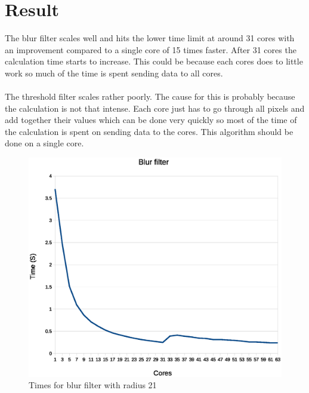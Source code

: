 \documentclass[10pt,twocolumn]{article}
\begin{document}
\section{Result}
The blur filter scales well and hits the lower time limit at around 31 cores with an improvement compared to a single core of 15 times faster. After 31 cores the calculation time starts to increase. This could be because each cores does to little work so much of the time is spent sending data to all cores.
\\
\\
The threshold filter scales rather poorly. The cause for this is probably because the calculation is not that intense. Each core just has to go through all pixels and add together their values which can be done very quickly so most of the time of the calculation is spent on sending data to the cores. This algorithm should be done on a single core.
\begin{figure}[H]
	\begin{center}
		\includegraphics[scale=0.4]{figurer/blur.eps}
	\end{center}
	\caption{Times for blur filter with radius 21}
\end{figure}
\end{document}

